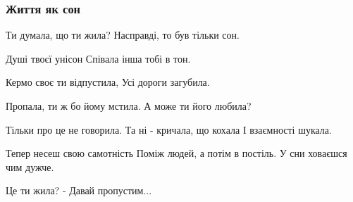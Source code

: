  
 
 

\subsubsection{Життя як сон}

Ти думала, що ти жила?
Насправді, то був тільки сон.

Душі твоєї унісон
Співала інша тобі в тон.

Кермо своє ти відпустила,
Усі дороги загубила.

Пропала, ти ж бо йому мстила.
А може ти його любила?

Тільки про це не говорила.
Та ні - кричала, що кохала
І взаємності шукала.

Тепер несеш свою самотність
Поміж людей, а потім в постіль.
У сни ховаєшся чим дужче.

Це ти жила? - Давай пропустим...

